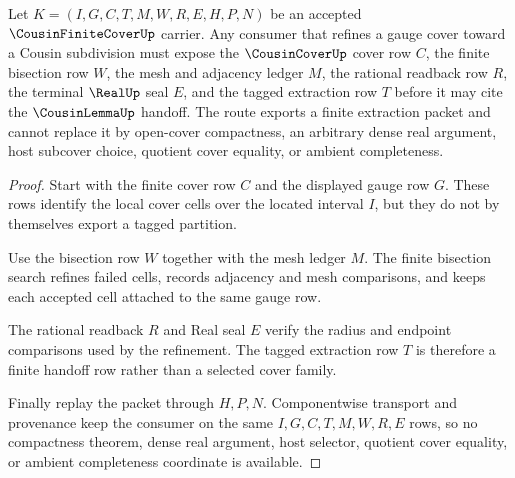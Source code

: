 \begin{theorem}
\label{thm:cousin-finite-cover-gauge-refinement-route}
Let $K=(I,G,C,T,M,W,R,E,H,P,N)$ be an accepted $\CousinFiniteCoverUp$ carrier. Any consumer that refines a gauge cover toward a Cousin subdivision must expose the $\CousinCoverUp$ cover row $C$, the finite bisection row $W$, the mesh and adjacency ledger $M$, the rational readback row $R$, the terminal $\RealUp$ seal $E$, and the tagged extraction row $T$ before it may cite the $\CousinLemmaUp$ handoff. The route exports a finite extraction packet and cannot replace it by open-cover compactness, an arbitrary dense real argument, host subcover choice, quotient cover equality, or ambient completeness.
\end{theorem}
\begin{proof}
Start with the finite cover row $C$ and the displayed gauge row $G$. These rows identify the local cover cells over the located interval $I$, but they do not by themselves export a tagged partition.

Use the bisection row $W$ together with the mesh ledger $M$. The finite bisection search refines failed cells, records adjacency and mesh comparisons, and keeps each accepted cell attached to the same gauge row.

The rational readback $R$ and Real seal $E$ verify the radius and endpoint comparisons used by the refinement. The tagged extraction row $T$ is therefore a finite handoff row rather than a selected cover family.

Finally replay the packet through $H,P,N$. Componentwise transport and provenance keep the consumer on the same $I,G,C,T,M,W,R,E$ rows, so no compactness theorem, dense real argument, host selector, quotient cover equality, or ambient completeness coordinate is available.
\end{proof}


